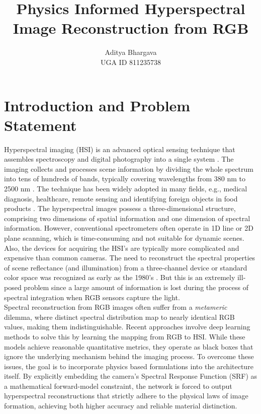 \documentclass[stu]{apa7}
\title{Physics Informed Hyperspectral Image Reconstruction from RGB}
\author{Aditya Bhargava \\ UGA ID 811235738}       %
\begin{document}
\maketitle



\section{Introduction and Problem Statement}

Hyperspectral imaging (HSI) is an advanced optical sensing technique that assembles spectroscopy and digital photography into a single system  \parencite{hong2026hyperspectralimaging}. The imaging collects and processes scene information by dividing the whole spectrum into tens of hundreds of bands, typically covering wavelengths from 380 nm to 2500 nm \parencite{Rybicki:847173}. The technique has been widely adopted in many fields, e.g., medical diagnosis, healthcare, remote sensing and identifying foreign objects in food products \parencite{ghimpeteanu2025hyperspectralimagingidentifyingforeign}. The hyperspectral images possess a three-dimensional structure, comprising two dimensions of spatial information and one dimension of spectral information. However, conventional spectrometers often operate in 1D line or 2D plane scanning, which is time-consuming and not suitable for dynamic scenes. Also, the devices for acquiring the HSI's are typically more complicated and expensive than common cameras. 
The need to reconstruct the spectral properties of scene reflectance (and illumination) from a three-channel device or standard color space was recognized as early as the 1980's \parencite{Hall1988IlluminationAC,Jaaskelainen:90, Maloney:86, Maloney:86, Parkkinen:89}. But this is an extremely ill-posed problem since a large amount of information is lost during the process of spectral integration when RGB sensors capture the light.\\ Spectral reconstruction from RGB images often suffer from a \textit{metameric} dilemma, where distinct spectral distribution map to nearly identical RGB values, making them indistinguishable. Recent approaches involve deep learning methods to solve this by learning the mapping from RGB to HSI. While these models achieve reasonable quantitative metrics, they operate as black boxes that ignore the underlying mechanism behind the imaging process. To overcome these issues, the goal is to incorporate physics based formulations into the architecture itself. By explicitly embedding the camera's Spectral Response Function (SRF) as a mathematical forward-model constraint, the network is forced to output hyperspectral reconstructions that strictly adhere to the physical laws of image formation, achieving both higher accuracy and reliable material distinction.
\end{document}
